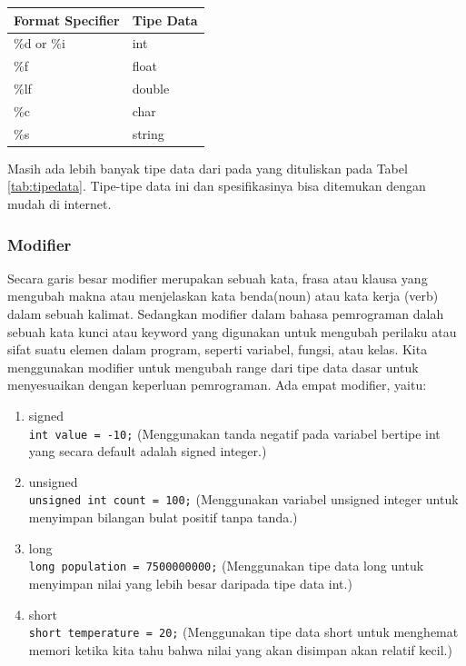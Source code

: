 \begin{center}
	\begin{tabular}{|l|l|}
		\hline
		Format Specifier & Tipe Data   \\ \hline
		\%d or \%i       & int          \\ \hline
		\%f              & float        \\ \hline
		\%lf             & double       \\ \hline
		\%c              & char         \\ \hline
		\%s              & string \\ \hline
	\end{tabular}
\end{center}
Masih ada lebih banyak tipe data dari pada yang dituliskan pada Tabel \ref{tab:tipedata}. Tipe-tipe data ini dan spesifikasinya bisa ditemukan dengan mudah di internet.

\subsubsection{Modifier}
Secara garis besar modifier merupakan sebuah kata, frasa atau klausa yang mengubah makna atau menjelaskan kata benda(noun) atau kata kerja (verb) dalam sebuah kalimat. 
Sedangkan modifier dalam bahasa pemrograman dalah sebuah kata kunci atau keyword yang digunakan untuk mengubah perilaku atau sifat suatu elemen dalam program, seperti variabel, fungsi, atau kelas.
Kita menggunakan modifier untuk mengubah range dari tipe data dasar untuk menyesuaikan dengan keperluan pemrograman. Ada empat modifier, yaitu:
\begin{enumerate}
	\item signed \\
	\verb|int value = -10;| (Menggunakan tanda negatif pada variabel bertipe int yang secara default adalah signed integer.)
	\item unsigned \\
	\verb|unsigned int count = 100;|  (Menggunakan variabel unsigned integer untuk menyimpan bilangan bulat positif tanpa tanda.)
	\item long \\ 
	\verb|long population = 7500000000;| (Menggunakan tipe data long untuk menyimpan nilai yang lebih besar daripada tipe data int.)
	\item short \\
	\verb|short temperature = 20;| (Menggunakan tipe data short untuk menghemat memori ketika kita tahu bahwa nilai yang akan disimpan akan relatif kecil.)
\end{enumerate}


